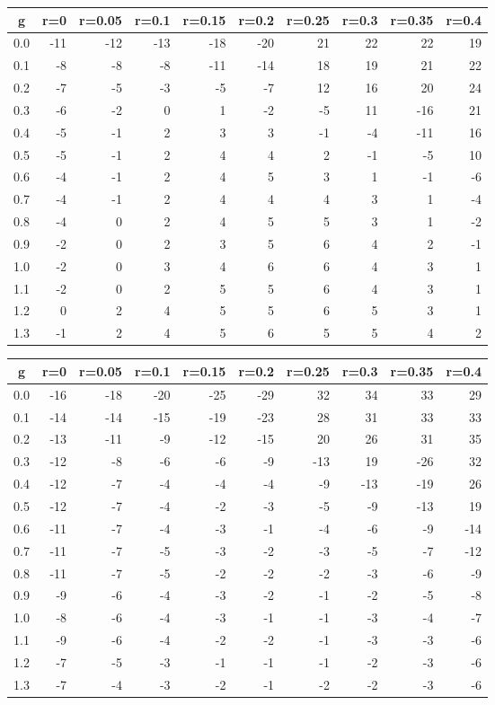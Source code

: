 %
\begin{table}[!tbp]
 \begin{center}
 \begin{tabular}{rrrrrrrrrr}\hline\hline
\multicolumn{1}{c}{g}&\multicolumn{1}{c}{r=0}&\multicolumn{1}{c}{r=0.05}&\multicolumn{1}{c}{r=0.1}&\multicolumn{1}{c}{r=0.15}&\multicolumn{1}{c}{r=0.2}&\multicolumn{1}{c}{r=0.25}&\multicolumn{1}{c}{r=0.3}&\multicolumn{1}{c}{r=0.35}&\multicolumn{1}{c}{r=0.4}\tabularnewline
\hline
0.0&-11&-12&-13&-18&-20&21&22& 22&19\tabularnewline
0.1& -8& -8& -8&-11&-14&18&19& 21&22\tabularnewline
0.2& -7& -5& -3& -5& -7&12&16& 20&24\tabularnewline
0.3& -6& -2&  0&  1& -2&-5&11&-16&21\tabularnewline
0.4& -5& -1&  2&  3&  3&-1&-4&-11&16\tabularnewline
0.5& -5& -1&  2&  4&  4& 2&-1& -5&10\tabularnewline
0.6& -4& -1&  2&  4&  5& 3& 1& -1&-6\tabularnewline
0.7& -4& -1&  2&  4&  4& 4& 3&  1&-4\tabularnewline
0.8& -4&  0&  2&  4&  5& 5& 3&  1&-2\tabularnewline
0.9& -2&  0&  2&  3&  5& 6& 4&  2&-1\tabularnewline
1.0& -2&  0&  3&  4&  6& 6& 4&  3& 1\tabularnewline
1.1& -2&  0&  2&  5&  5& 6& 4&  3& 1\tabularnewline
1.2&  0&  2&  4&  5&  5& 6& 5&  3& 1\tabularnewline
1.3& -1&  2&  4&  5&  6& 5& 5&  4& 2\tabularnewline
\hline
\end{tabular}

\end{center}

\end{table}

%
\begin{table}[!tbp]
 \begin{center}
 \begin{tabular}{rrrrrrrrrr}\hline\hline
\multicolumn{1}{c}{g}&\multicolumn{1}{c}{r=0}&\multicolumn{1}{c}{r=0.05}&\multicolumn{1}{c}{r=0.1}&\multicolumn{1}{c}{r=0.15}&\multicolumn{1}{c}{r=0.2}&\multicolumn{1}{c}{r=0.25}&\multicolumn{1}{c}{r=0.3}&\multicolumn{1}{c}{r=0.35}&\multicolumn{1}{c}{r=0.4}\tabularnewline
\hline
0.0&-16&-18&-20&-25&-29& 32& 34& 33& 29\tabularnewline
0.1&-14&-14&-15&-19&-23& 28& 31& 33& 33\tabularnewline
0.2&-13&-11& -9&-12&-15& 20& 26& 31& 35\tabularnewline
0.3&-12& -8& -6& -6& -9&-13& 19&-26& 32\tabularnewline
0.4&-12& -7& -4& -4& -4& -9&-13&-19& 26\tabularnewline
0.5&-12& -7& -4& -2& -3& -5& -9&-13& 19\tabularnewline
0.6&-11& -7& -4& -3& -1& -4& -6& -9&-14\tabularnewline
0.7&-11& -7& -5& -3& -2& -3& -5& -7&-12\tabularnewline
0.8&-11& -7& -5& -2& -2& -2& -3& -6& -9\tabularnewline
0.9& -9& -6& -4& -3& -2& -1& -2& -5& -8\tabularnewline
1.0& -8& -6& -4& -3& -1& -1& -3& -4& -7\tabularnewline
1.1& -9& -6& -4& -2& -2& -1& -3& -3& -6\tabularnewline
1.2& -7& -5& -3& -1& -1& -1& -2& -3& -6\tabularnewline
1.3& -7& -4& -3& -2& -1& -2& -2& -3& -6\tabularnewline
\hline
\end{tabular}

\end{center}

\end{table}

